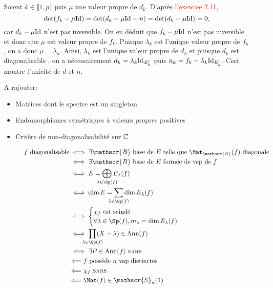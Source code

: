 \begin{solution}
    Soient $k \in \llbracket 1, p \rrbracket$ puis $\mu$ une valeur propre de $d_k$. D'après \textcolor{red}{l'exercice 2.11}, 
    $$\det(f_k - \mu \mathrm{Id}) = \det(d_k - \mu \mathrm{Id} + n) = \det(d_k - \mu \mathrm{Id}) = 0,$$
    car $d_k - \mu \mathrm{Id}$ n'est pas inversible. On en déduit que $f_k - \mu \mathrm{Id}$ n'est pas inversible et donc que $\mu$ est valeur propre de $f_k$. Puisque $\lambda_k$ est l'unique valeur propre de $f_k$, on a donc $\mu = \lambda_k$. Ainsi, $\lambda_k$ est l'unique valeur propre de $d_k$ et puisque $d_k$ est diagonalisable \note {}, on a nécessairement $d_k = \lambda_k \mathrm{Id}_{E'_k}$ puis $n_k = f_k - \lambda_k \mathrm{Id}_{E'_k}$. Ceci montre l'unicité de $d$ et $n$.
\end{solution}

A rajouter:
\begin{itemize}
    \item Matrices dont le spectre est un singleton
    \item Endomorphismes symétriques à valeurs propres positives
    \item Critère de non-diagonalisabilité sur $\mathbb{C}$
\end{itemize}

\newpage

\begin{figure*}
    \begin{Large}
    \begin{align*}
        f \text{ diagonalisable} &\iff \exists \mathscr{B} \text{ base de } E \text{ telle que } \Mat_\mathscr{B}(f) \text{ diagonale} \\
        &\iff \exists \mathscr{B} \text{ base de } E \text{ formée de vep de } f\\
        &\iff E = \smashoperator{\bigoplus_{\lambda \in \Sp(f)}} E_\lambda(f) \\
        &\iff \dim E = \smashoperator{\sum_{\lambda \in \Sp(f)}} \dim E_\lambda(f) \\
        &\iff 
        \begin{cases}
        \chi_f \text{ est scindé} \\
        \forall \lambda \in \Sp(f), m_{\lambda} = \dim E_\lambda(f)
        \end{cases} \\
        &\iff \smashoperator{\prod_{\lambda \in \Sp(f)}}(X-\lambda) \in \mathrm{Ann}(f)\\
        &\iff \exists P \in \mathrm{Ann}(f) \text{ \textsc{sars}} \\
        &\Longleftarrow f \text{ possède } n \text{ vap distinctes} \\
        &\Longleftarrow \chi_f \text{ \textsc{sars}}\\
        &\Longleftarrow \Mat(f) \in \mathscr{S}_n(\R)
    \end{align*}
    \end{Large}
\end{figure*}

